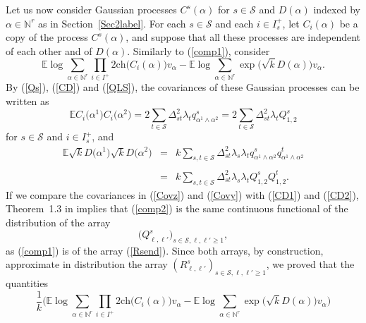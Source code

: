 \documentclass[aop,MSNbibl,dvips]{arximspdf}
\def\cal{\mathscr}
\newcommand{\spe}{{\cal S}}
\newcommand{\ch}{\mathrm{ch}}
\newcommand{\smsp}{}
\newcommand{\e}{\mathbb{E}}
\newcommand{\Natural}{\mathbb{N}}
\begin{document}
Let us now consider Gaussian processes $C^s(\alpha)$ for $s\in\spe$ and
$D(\alpha)$ indexed by $\alpha\in\Natural^r$ as in Section~\ref{Sec2label}. For each $s\in\spe$ and each $i\in I^+_s$, let
$C_i(\alpha
)$ be a copy of the process $C^s(\alpha)$, and suppose that all these
processes are independent of each other and of $D(\alpha)$. Similarly
to (\ref{comp1}), consider
%
\begin{equation}
\e\log\sum_{\alpha\in\Natural^r} \prod_{i\in I^+}
2\smsp\ch \bigl(C_{i}(\alpha) \bigr) v_\alpha - \e\log\sum
_{\alpha\in\Natural^r} \exp \bigl(\sqrt{k}D(\alpha ) \bigr)
v_\alpha. \label{comp2}
\end{equation}
%
By (\ref{Qs}), (\ref{CD}) and (\ref{QLS}), the covariances of these
Gaussian processes can be written as
%
\begin{equation}
\e C_i\bigl(\alpha^1\bigr) C_i\bigl(
\alpha^2\bigr) = 2\sum_{t\in\spe}
\Delta_{st}^2 \lambda_t q^s_{\alpha^1\wedge
\alpha^2}
= 2\sum_{t\in\spe} \Delta_{st}^2
\lambda_t Q^s_{1,2} \label{CD1}
\end{equation}
%
for $s\in\spe$ and $i\in I_s^+$, and
%
\begin{eqnarray}\label{CD2}
\e\sqrt{k}D\bigl(\alpha^1\bigr) \sqrt{k}D\bigl(\alpha^2
\bigr) &=& k \sum_{s,t\in\spe} \Delta_{st}^2
\lambda_s \lambda_t q^s_{\alpha
^1\wedge\alpha^2}q^t_{\alpha^1\wedge\alpha^2}
\nonumber
\\[-8pt]
\\[-8pt]
\nonumber
&=& k \sum_{s,t\in\spe} \Delta_{st}^2
\lambda_s \lambda_t Q^s_{1,2}
Q^t_{1,2}.
\nonumber
\end{eqnarray}
%
If we compare the covariances in (\ref{Covz}) and (\ref{Covy}) with
(\ref{CD1}) and (\ref{CD2}), Theorem~1.3 in \cite{SKmodel} implies that
(\ref{comp2}) is the same continuous functional of the distribution of
the array
%
\begin{equation}
\bigl(Q^s_{\ell,\ell'} \bigr)_{s\in\spe,\ell,\ell'\geq1} \label{Qsend},
\end{equation}
%
as (\ref{comp1}) is of the array (\ref{Rsend}). Since both arrays, by
construction, approximate in distribution the array $(R^s_{\ell,\ell
'})_{s\in\spe,\ell,\ell'\geq1}$, we proved that the quantities
%
\begin{equation}
\frac{1}{k} \biggl( \e\log\sum_{\alpha\in\Natural^r} \prod
_{i\in I^+} 2\smsp\ch \bigl(C_{i}(\alpha)
\bigr) v_\alpha - \e\log\sum_{\alpha\in\Natural^r} \exp
\bigl(\sqrt{k} D(\alpha ) \bigr) v_\alpha \biggr) \label{lowerend}
\end{equation}
\end{document}
